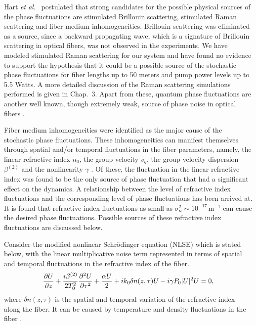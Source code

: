 Hart {\it et al}.\ \cite{hart1} postulated that strong candidates for the possible 
physical sources of the phase fluctuations are stimulated Brillouin 
scattering, stimulated Raman scattering and fiber medium inhomogeneities. 
Brillouin scattering was eliminated as a source, since a backward propagating 
wave, which is a signature of Brillouin scattering in optical fibers, was not 
observed in the experiments. We have  modeled stimulated Raman scattering 
\cite{Agrawal8, headley} for our system and have found no evidence to
support the hypothesis that it could be a possible source of the stochastic phase 
fluctuations for fiber lengths up to 50 meters and pump power levels up to 5.5 Watts. 
A more detailed discussion of the Raman scattering simulations performed is given in Chap.\ 3.
Apart from these, quantum phase fluctuations are another well 
known, though extremely weak, source of phase noise in optical fibers 
\cite{Agrawal2,perlmutter1}.

Fiber medium inhomogeneities were identified as the major cause of the 
stochastic phase fluctuations. These inhomogeneities can manifest themselves 
through spatial and/or temporal fluctuations in the fiber parameters, namely, 
the linear refractive index $n_0$, the group velocity $v_g$, the group 
velocity dispersion $\beta^{(2)}$ and the nonlinearity 
$\gamma$ \cite{abdullaev}. Of these, the fluctuation in the linear refractive 
index was found to be the only source of phase fluctuation that had a 
significant effect on the dynamics. A relationship between the level of 
refractive index fluctuations and the  corresponding level of phase 
fluctuations has been arrived at. It is found that refractive index 
fluctuations as small as $\sigma_n^2 \sim 10^{-17}$\,m$^{-1}$ can cause the 
desired phase fluctuations. Possible sources of these refractive index 
fluctuations are discussed below.   

Consider the modified nonlinear Schr\"odinger equation (NLSE) which is
stated below, with the linear multiplicative noise term represented in terms of 
spatial and temporal fluctuations in the refractive index of the fiber.
\begin{equation}
{\partial U \over \partial z} + {i\beta^{(2)} \over 2T_0^2} {\partial^2U \over \partial\tau^2} + {\alpha U \over 2} + ik_0 \delta n(z,\tau)U - i\gamma P_{0}|U|^2 U = 0 ,
\end{equation}
where $\delta n(z,\tau)$ is the spatial and temporal variation of the refractive 
index along the fiber. It can be caused by temperature and density 
fluctuations in the fiber \cite{glenn}. 

